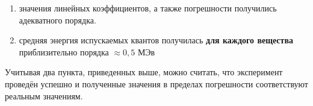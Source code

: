 	\begin{enumerate}
		\item значения линейных коэффициентов, а также погрешности получились адекватного порядка.
		\item средняя энергия испускаемых квантов получилась \textbf{для каждого вещества} приблизительно порядка $\approx 0,5 \text{ МЭв}$
	\end{enumerate}

	Учитывая два пункта, приведенных выше, можно считать, что эксперимент проведён успешно и полученные значения в пределах погрешности соответствуют реальным значениям. 







